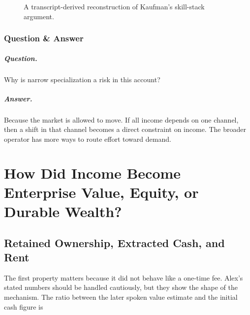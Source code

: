 \documentclass[11pt,oneside]{book}
\begin{document}
\begin{figure}
\centering
{}
\caption{A transcript-derived reconstruction of Kaufman's skill-stack argument.}
\end{figure}

\subsection{Question \& Answer}

\paragraph{Question.}
Why is narrow specialization a risk in this account?

\paragraph{Answer.}
Because the market is allowed to move. If all income depends on one channel, then a shift in that channel becomes a direct constraint on income. The broader operator has more ways to route effort toward demand.

\chapter{How Did Income Become Enterprise Value, Equity, or Durable Wealth?}

\section{Retained Ownership, Extracted Cash, and Rent}

The first property matters because it did not behave like a one-time fee. Alex's stated numbers should be handled cautiously, but they show the shape of the mechanism. The ratio between the later spoken value estimate and the initial cash figure is
\end{document}
